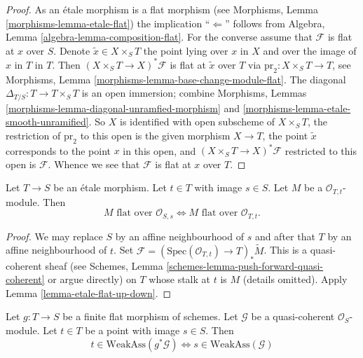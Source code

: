 \begin{proof}
As an \'etale morphism is a flat morphism (see
Morphisms, Lemma \ref{morphisms-lemma-etale-flat})
the implication ``$\Leftarrow$'' follows from
Algebra, Lemma \ref{algebra-lemma-composition-flat}.
For the converse assume that $\mathcal{F}$ is flat at $x$ over $S$.
Denote $\tilde x \in X \times_S T$ the point lying over $x$ in $X$
and over the image of $x$ in $T$ in $T$.
Then $(X \times_S T \to X)^*\mathcal{F}$ is flat at $\tilde x$ over $T$
via $\text{pr}_2 : X \times_S T \to T$, see
Morphisms, Lemma \ref{morphisms-lemma-base-change-module-flat}.
The diagonal $\Delta_{T/S} : T \to T \times_S T$ is an open immersion;
combine
Morphisms, Lemmas \ref{morphisms-lemma-diagonal-unramfied-morphism} and
\ref{morphisms-lemma-etale-smooth-unramified}.
So $X$ is identified with open subscheme of $X \times_S T$,
the restriction of $\text{pr}_2$ to this open is the given morphism $X \to T$,
the point $\tilde x$ corresponds to the point $x$ in this open, and
$(X \times_S T \to X)^*\mathcal{F}$ restricted to this open is $\mathcal{F}$.
Whence we see that $\mathcal{F}$ is flat at $x$ over $T$.
\end{proof}

\begin{lemma}
\label{lemma-etale-flat-up-down-local-ring}
Let $T \to S$ be an \'etale morphism. Let $t \in T$ with image $s \in S$.
Let $M$ be a $\mathcal{O}_{T, t}$-module. Then
$$
M\text{ flat over }\mathcal{O}_{S, s}
\Leftrightarrow
M\text{ flat over }\mathcal{O}_{T, t}.
$$
\end{lemma}

\begin{proof}
We may replace $S$ by an affine neighbourhood of $s$ and after that
$T$ by an affine neighbourhood of $t$.
Set $\mathcal{F} = (\text{Spec}(\mathcal{O}_{T, t}) \to T)_*\widetilde M$.
This is a quasi-coherent sheaf (see
Schemes, Lemma \ref{schemes-lemma-push-forward-quasi-coherent}
or argue directly)
on $T$ whose stalk at $t$ is $M$ (details omitted).
Apply
Lemma \ref{lemma-etale-flat-up-down}.
\end{proof}

\begin{lemma}
\label{lemma-finite-flat-weak-assassin-up-down}
Let $g : T \to S$ be a finite flat morphism of schemes.
Let $\mathcal{G}$ be a quasi-coherent $\mathcal{O}_S$-module.
Let $t \in T$ be a point with image $s \in S$. Then
$$
t \in \text{WeakAss}(g^*\mathcal{G})
\Leftrightarrow
s \in \text{WeakAss}(\mathcal{G})
$$
\end{lemma}

